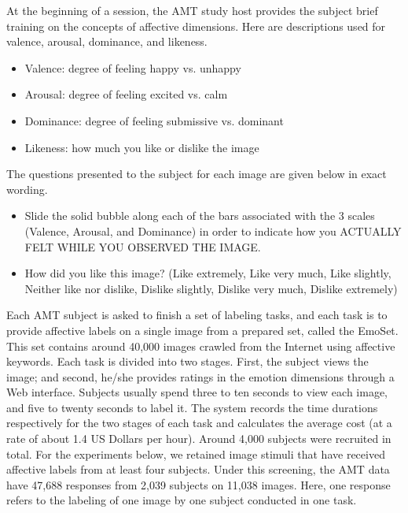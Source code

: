 \documentclass[10pt,journal,letterpaper,compsoc,twoside]{IEEEtran}
\begin{document}
{At the beginning of a session, the AMT study host provides the subject brief training on the concepts of affective dimensions. Here are descriptions used for
valence, arousal, dominance, and likeness. 
\begin{itemize}
\item Valence: degree of feeling happy vs. unhappy
\item Arousal: degree of feeling excited vs. calm
\item Dominance: degree of feeling submissive vs. dominant
\item Likeness: how much you like or dislike the image
\end{itemize}
The questions presented to the subject for each image are given below in exact wording.
\begin{itemize}
\item Slide the solid bubble along each of the bars associated with the 3 scales (Valence, Arousal, and Dominance) in order to indicate how you ACTUALLY FELT WHILE YOU OBSERVED THE IMAGE.
\item How did you like this image? (Like extremely,
 Like very much,
 Like slightly,
 Neither like nor dislike,
 Dislike slightly,
 Dislike very much,
 Dislike extremely)
\end{itemize}
}

{Each AMT subject is asked to finish a set of labeling tasks,
and each task is to provide affective labels on a single image from a prepared set, called the EmoSet. This set contains
around 40,000 images crawled from the Internet using affective keywords. Each task 
is divided into two stages. First, the subject views the image; and second, he/she provides ratings in the emotion dimensions through a Web interface. Subjects usually spend three to ten seconds to view each image, and five to twenty seconds 
to label it. The system records the time durations respectively for the two stages of each task and calculates the average
cost (at a rate of about 1.4 US Dollars per hour). Around 4,000 subjects were recruited in total.}
For the experiments below, 
we retained image stimuli that have received affective labels from at least four subjects.
Under this screening, the AMT data have 47,688 responses from 
2,039 subjects on 11,038 images. Here, one response refers to the labeling of one image by one subject conducted in one task.
\end{document}

